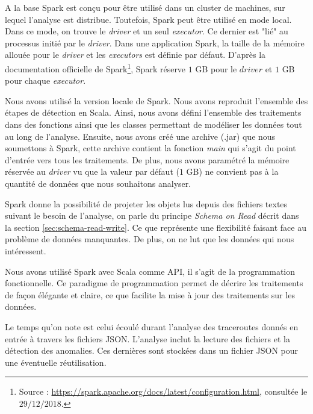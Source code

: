 A la base Spark est conçu pour être utilisé dans un cluster de machines, sur  lequel l'analyse est distribue. Toutefois, Spark peut être utilisé en mode local. Dans ce mode, on trouve le \textit{driver} et un seul \textit{executor}. Ce dernier est "lié" au processus initié par le \textit{driver}. 
Dans une application Spark, la taille de la mémoire allouée pour le \textit{driver} et les \textit{executors} est  définie par défaut. D'après la documentation officielle de Spark\footnote{Source : \url{https://spark.apache.org/docs/latest/configuration.html}, consultée le $29/12/2018$.}, Spark réserve $ 1 $ GB pour le $ driver $ et $ 1 $ GB pour chaque \textit{executor}. 


Nous avons utilisé la version locale de Spark. Nous avons reproduit l'ensemble des étapes de détection en Scala. Ainsi,  nous avons défini l'ensemble des traitements dans des fonctions ainsi que les classes permettant de modéliser les données tout au long de l'analyse. Ensuite, nous avons créé une archive (.jar) que nous soumettons à Spark, cette archive contient la fonction \textit{main} qui s'agit du point d'entrée vers tous les traitements. De plus, nous avons paramétré la mémoire  réservée au \textit{driver} vu que la valeur par défaut ($1$ GB) ne convient pas à la quantité de données que nous souhaitons analyser.


Spark donne la possibilité  de projeter les objets lus  depuis des  fichiers textes suivant le besoin de l'analyse, on parle du principe \textit{ Schema on Read} décrit dans la section \ref{sec:schema-read-write}. Ce que représente une flexibilité faisant face au problème de données manquantes.  De plus, on ne lut que les données qui nous intéressent. 
 

Nous avons utilisé Spark avec Scala comme API, il s'agit de la programmation fonctionnelle. Ce paradigme de programmation permet de décrire les traitements de façon élégante et claire, ce que facilite la mise à jour des traitements sur les données. 

  
Le temps qu'on note est celui écoulé durant l'analyse des traceroutes donnés en entrée à travers les fichiers JSON. L'analyse inclut la lecture des fichiers et la détection des anomalies. Ces dernières sont stockées dans un fichier JSON pour une éventuelle réutilisation.



 

